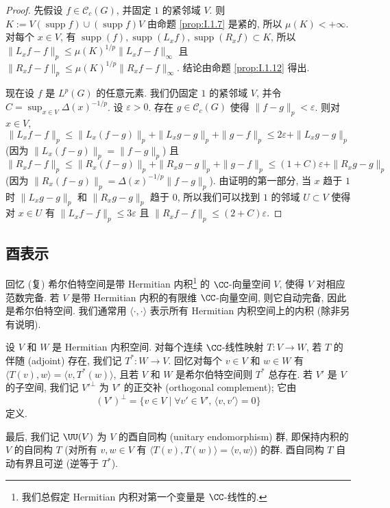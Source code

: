 \begin{proof}
先假设 $f \in \mathcal{C}_c(G)$, 并固定 $1$ 的紧邻域 $V$. 则 $K := V(\operatorname{supp} f) \cup (\operatorname{supp} f)V$ 由命题 \ref{prop:I.1.7} 是紧的, 所以 $\mu(K) < +\infty$. 对每个 $x \in V$, 有 $\operatorname{supp}(f), \operatorname{supp}(L_xf), \operatorname{supp}(R_xf) \subset K$, 所以 $\|L_xf - f\|_p \leq \mu(K)^{1/p}\|L_xf - f\|_{\infty}$ 且 $\|R_xf - f\|_p \leq \mu(K)^{1/p}\|R_xf - f\|_{\infty}$. 结论由命题 \ref{prop:I.1.12} 得出.

现在设 $f$ 是 $L^p(G)$ 的任意元素. 我们仍固定 $1$ 的紧邻域 $V$, 并令 $C = \sup_{x \in V}\Delta(x)^{-1/p}$. 设 $\varepsilon > 0$. 存在 $g \in \mathcal{C}_c(G)$ 使得 $\|f - g\|_p < \varepsilon$. 则对 $x \in V$,
\[
\|L_xf - f\|_p \leq \|L_x(f - g)\|_p + \|L_xg - g\|_p + \|g - f\|_p \leq 2\varepsilon + \|L_xg - g\|_p
\]
(因为 $\|L_x(f - g)\|_p = \|f - g\|_p$) 且
\[
\|R_xf - f\|_p \leq \|R_x(f - g)\|_p + \|R_xg - g\|_p + \|g - f\|_p \leq (1 + C)\varepsilon + \|R_xg - g\|_p
\]
(因为 $\|R_x(f - g)\|_p = \Delta(x)^{-1/p}\|f - g\|_p$). 由证明的第一部分, 当 $x$ 趋于 $1$ 时 $\|L_xg - g\|_p$ 和 $\|R_xg - g\|_p$ 趋于 $0$, 所以我们可以找到 $1$ 的邻域 $U \subset V$ 使得对 $x \in U$ 有 $\|L_xf - f\|_p \leq 3\varepsilon$ 且 $\|R_xf - f\|_p \leq (2 + C)\varepsilon$.
\end{proof}

\subsection{酉表示}

回忆 (复) 希尔伯特空间是带 Hermitian 内积\footnote{我们总假定 Hermitian 内积对第一个变量是 $\CC$-线性的.} 的 $\CC$-向量空间 $V$, 使得 $V$ 对相应范数完备. 若 $V$ 是带 Hermitian 内积的有限维 $\CC$-向量空间, 则它自动完备, 因此是希尔伯特空间. 我们通常用 $\langle \cdot, \cdot \rangle$ 表示所有 Hermitian 内积空间上的内积 (除非另有说明).

\begin{notation}[伴随算子与正交补]
\label{not:I.3.2.1}
设 $V$ 和 $W$ 是 Hermitian 内积空间. 对每个连续 $\CC$-线性映射 $T \colon V \to W$, 若 $T$ 的伴随 (adjoint) 存在, 我们记 $T^* \colon W \to V$. 回忆对每个 $v \in V$ 和 $w \in W$ 有 $\langle T(v), w \rangle = \langle v, T^*(w) \rangle$, 且若 $V$ 和 $W$ 是希尔伯特空间则 $T^*$ 总存在.
若 $V'$ 是 $V$ 的子空间, 我们记 $V'^{\perp}$ 为 $V'$ 的正交补 (orthogonal complement); 它由
\[
(V')^{\perp} = \{v \in V \mid \forall v' \in V',\, \langle v, v' \rangle = 0\}
\]
定义.

最后, 我们记 $\UU(V)$ 为 $V$ 的酉自同构 (unitary endomorphism) 群, 即保持内积的 $V$ 的自同构 $T$ (对所有 $v, w \in V$ 有 $\langle T(v), T(w) \rangle = \langle v, w \rangle$) 的群. 酉自同构 $T$ 自动有界且可逆 (逆等于 $T^*$).
\end{notation}

